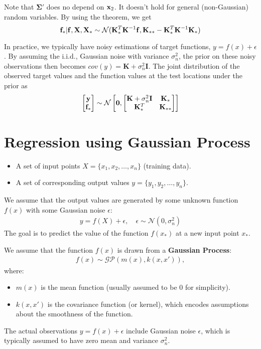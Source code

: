 Note that $\mathbf{\Sigma}'$ does no depend on ${\mathbf{x}}_2$. It doesn't hold for general (non-Gaussian) random variables.
By using the theorem, we get
$${\mathbf{f}}_*|{\mathbf{f}}, \mathbf{X}, \mathbf{X}_*\sim \mathcal{N}(\mathbf{K}_*^T\mathbf{K}^{-1}{\mathbf{f}}, \mathbf{K}_{**}-\mathbf{K}_*^T\mathbf{K}^{-1}\mathbf{K}_{*})$$

In practice, we typically have noisy estimations of target functions, $y = f(x)+\epsilon$. By assuming the i.i.d., Gaussian noise with variance $\sigma_n^2$, the prior on these noisy observations then becomes $cov(y) = \mathbf{K}+\sigma_n^2\mathbf{I}$. The joint distribution of the observed target values and the function values at the test locations under the prior as 
\begin{align*}
	\begin{bmatrix}
		{\mathbf{y}}\\
		{\mathbf{f}}_*
	\end{bmatrix} \sim \mathcal{N}
	\begin{bmatrix}
		\mathbf{0}, \begin{bmatrix}
			\mathbf{K}+\sigma_n^2\mathbf{I} & \mathbf{K}_*\\
			\mathbf{K}_*^T & \mathbf{K}_{**}
		\end{bmatrix}
	\end{bmatrix}
\end{align*}

\section{Regression using Gaussian Process}
\begin{itemize}
	\item A set of input points $X = \{x_1, x_2, \dots, x_n\}$ (\ie training data).
	\item A set of corresponding output values $y = \{y_1, y_2, \dots, y_n\}$.
\end{itemize}
We assume that the output values are generated by some unknown function $f(x)$ with some Gaussian noise $\epsilon$:
\begin{align*}
	y = f(X) + \epsilon, \quad \epsilon \sim \mathcal{N}(0, \sigma_n^2)
\end{align*}
The goal is to predict the value of the function $f(x_*)$ at a new input point $x_*$.

We assume that the function $f(x)$ is drawn from a \textbf{Gaussian Process}:
\begin{align*}
	f(x) \sim \mathcal{GP}(m(x), k(x, x')),
\end{align*}
where:
\begin{itemize}
	\item $m(x)$ is the mean function (usually assumed to be 0 for simplicity).
	\item $k(x, x')$ is the covariance function (or kernel), which encodes assumptions about the smoothness of the function.
\end{itemize}
The actual observations $y = f(x) + \epsilon$ include Gaussian noise $\epsilon$, which is typically assumed to have zero mean and variance \( \sigma_n^2 \).

